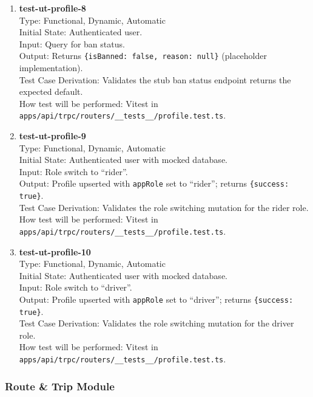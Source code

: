 \documentclass[12pt, titlepage]{article}
\begin{document}
\begin{enumerate}
\item \textbf{test-ut-profile-8}\\
Type: Functional, Dynamic, Automatic\\
Initial State: Authenticated user.\\
Input: Query for ban status.\\
Output: Returns \texttt{\{isBanned: false, reason: null\}} (placeholder implementation).\\
Test Case Derivation: Validates the stub ban status endpoint returns the expected default.\\
How test will be performed: Vitest in \texttt{apps/api/trpc/routers/\_\_tests\_\_/profile.test.ts}.\\

\item \textbf{test-ut-profile-9}\\
Type: Functional, Dynamic, Automatic\\
Initial State: Authenticated user with mocked database.\\
Input: Role switch to ``rider''.\\
Output: Profile upserted with \texttt{appRole} set to ``rider''; returns \texttt{\{success: true\}}.\\
Test Case Derivation: Validates the role switching mutation for the rider role.\\
How test will be performed: Vitest in \texttt{apps/api/trpc/routers/\_\_tests\_\_/profile.test.ts}.\\

\item \textbf{test-ut-profile-10}\\
Type: Functional, Dynamic, Automatic\\
Initial State: Authenticated user with mocked database.\\
Input: Role switch to ``driver''.\\
Output: Profile upserted with \texttt{appRole} set to ``driver''; returns \texttt{\{success: true\}}.\\
Test Case Derivation: Validates the role switching mutation for the driver role.\\
How test will be performed: Vitest in \texttt{apps/api/trpc/routers/\_\_tests\_\_/profile.test.ts}.\\
\end{enumerate}

\subsubsection{Route \& Trip Module}
\end{document}
